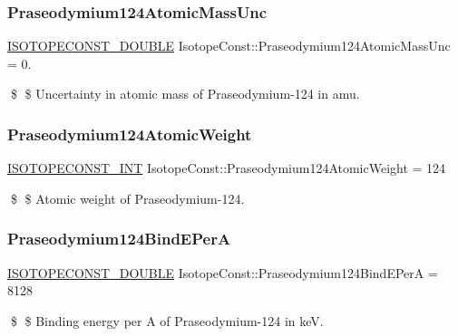 \subsubsection{\texorpdfstring{Praseodymium124\+Atomic\+Mass\+Unc}{Praseodymium124AtomicMassUnc}}
{\footnotesize\ttfamily \mbox{\hyperlink{group___isotope_const-_macros_ga8f45a7272ce02c0b4c65c44636ed719a}{I\+S\+O\+T\+O\+P\+E\+C\+O\+N\+S\+T\+\_\+\+D\+O\+U\+B\+LE}} Isotope\+Const\+::\+Praseodymium124\+Atomic\+Mass\+Unc = 0.}

\$ \$ Uncertainty in atomic mass of Praseodymium-\/124 in amu. \mbox{\label{group___isotope_const-_praseodymium-_pr124_ga6c9cfc269d14a764fb9739ff2f50af59}} 
\subsubsection{\texorpdfstring{Praseodymium124\+Atomic\+Weight}{Praseodymium124AtomicWeight}}
{\footnotesize\ttfamily \mbox{\hyperlink{group___isotope_const-_macros_ga5f18360b3e99483a35c32d789e62621c}{I\+S\+O\+T\+O\+P\+E\+C\+O\+N\+S\+T\+\_\+\+I\+NT}} Isotope\+Const\+::\+Praseodymium124\+Atomic\+Weight = 124}

\$ \$ Atomic weight of Praseodymium-\/124. \mbox{\label{group___isotope_const-_praseodymium-_pr124_ga1c8dd00193fedacada8e82b8e5957ab0}} 
\subsubsection{\texorpdfstring{Praseodymium124\+Bind\+E\+PerA}{Praseodymium124BindEPerA}}
{\footnotesize\ttfamily \mbox{\hyperlink{group___isotope_const-_macros_ga8f45a7272ce02c0b4c65c44636ed719a}{I\+S\+O\+T\+O\+P\+E\+C\+O\+N\+S\+T\+\_\+\+D\+O\+U\+B\+LE}} Isotope\+Const\+::\+Praseodymium124\+Bind\+E\+PerA = 8128}

\$ \$ Binding energy per A of Praseodymium-\/124 in keV. \mbox{\label{group___isotope_const-_praseodymium-_pr124_gaa71ce4d34501d1c41e20c84b5367cfe1}} 
